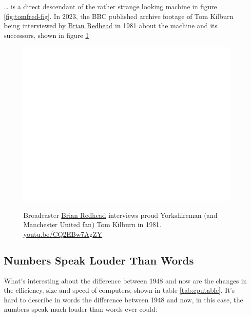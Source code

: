 \documentclass[
  12pt,
]{book}
\begin{document}
\ldots{} is a direct descendant of the rather strange looking machine in figure \ref{fig:tomfred-fig}. In 2023, the BBC published archive footage of Tom Kilburn being interviewed by \href{https://en.wikipedia.org/wiki/Brian_Redhead}{Brian Redhead} in 1981 about the machine and its successors, shown in figure \ref{fig:redhead-fig}

\begin{figure}

{\centering \href{https://www.youtube.com/embed/CQ2EBw7AgZY}{\includegraphics[width=0.99\linewidth]{duncan-hull_files/figure-latex/redhead-fig-1} }

}

\caption{Broadcaster \href{https://en.wikipedia.org/wiki/Brian_Redhead}{Brian Redhead} interviews proud Yorkshireman (and Manchester United fan) Tom Kilburn in 1981. \href{https://youtu.be/CQ2EBw7AgZY}{youtu.be/CQ2EBw7AgZY} \citep{youtube-redhead}}\label{fig:redhead-fig}
\end{figure}



\hypertarget{louder}{%
\subsection{Numbers Speak Louder Than Words}\label{louder}}

What's interesting about the difference between 1948 and now are the changes in the efficiency, size and speed of computers, shown in table \ref{tab:cputable}. It's hard to describe in words the difference between 1948 and now, in this case, the numbers speak much louder than words ever could:
\end{document}
